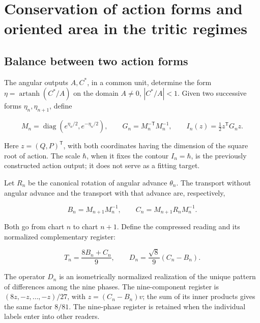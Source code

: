 \chapter{Conservation of action forms and oriented area in the tritic regimes}
\label{x_reciprocidad:nuclear:8}
\section{Balance between two action forms}

The angular outputs \(A,C^*\), in a common unit, determine the form \(\eta=\operatorname{artanh}(C^*/A)\) on the domain \(A\ne0\), \(|C^*/A|<1\). Given two successive forms \(\eta_n,\eta_{n+1}\), define

\[
M_n=\operatorname{diag}(e^{\eta_n/2},e^{-\eta_n/2}),\qquad
G_n=M_n^{-\mathsf T}M_n^{-1},\qquad
I_n(z)=\tfrac12z^\mathsf TG_nz.
\]

Here \(z=(Q,P)^\mathsf T\), with both coordinates having the dimension of the square root of action. The scale \(\hbar\), when it fixes the contour \(I_n=\hbar\), is the previously constructed action output; it does not serve as a fitting target.

Let \(R_n\) be the canonical rotation of angular advance \(\theta_n\). The transport without angular advance and the transport with that advance are, respectively,

\begin{equation}
B_n=M_{n+1}M_n^{-1},\qquad
C_n=M_{n+1}R_nM_n^{-1}.
\label{x_reciprocidad:nuc08:eq:1}
\end{equation}

Both go from chart \(n\) to chart \(n+1\). Define the compressed reading and its normalized complementary register:

\begin{equation}
T_n=\frac{8B_n+C_n}{9},\qquad
D_n=\frac{\sqrt8}{9}(C_n-B_n).
\label{x_reciprocidad:nuc08:eq:2}
\end{equation}

The operator \(D_n\) is an isometrically normalized realization of the unique pattern of differences among the nine phases. The nine-component register is \((8z,-z,\ldots,-z)/27\), with \(z=(C_n-B_n)v\); the sum of its inner products gives the same factor \(8/81\). The nine-phase register is retained when the individual labels enter into other readers.

